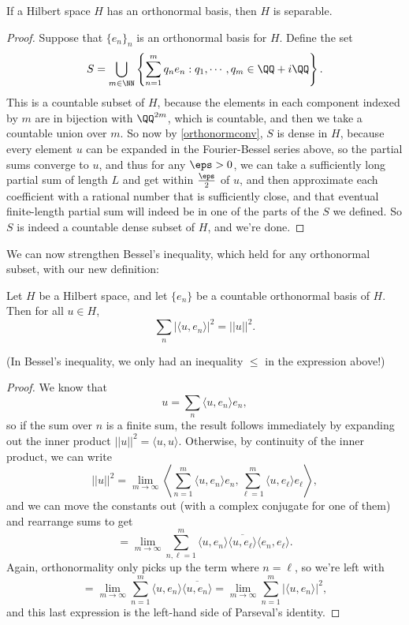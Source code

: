 \begin{corollary}
If a Hilbert space $H$ has an orthonormal basis, then $H$ is separable.
\end{corollary}
\begin{proof}
Suppose that $\{e_n\}_n$ is an orthonormal basis for $H$. Define the set 
\[
    S = \bigcup_{m \in \NN} \left\{\sum_{n=1}^m q_n e_n: q_1, \cdots, q_m \in \QQ + i \QQ\right\}.
\]  
This is a countable subset of $H$, because the elements in each component indexed by $m$ are in bijection with $\QQ^{2m}$, which is countable, and then we take a countable union over $m$. So now by \cref{orthonormconv}, $S$ is dense in $H$, because every element $u$ can be expanded in the Fourier-Bessel series above, so the partial sums converge to $u$, and thus for any $\eps > 0$, we can take a sufficiently long partial sum of length $L$ and get within $\frac{\eps}{2}$ of $u$, and then approximate each coefficient with a rational number that is sufficiently close, and that eventual finite-length partial sum will indeed be in one of the parts of the $S$ we defined. So $S$ is indeed a countable dense subset of $H$, and we're done.
\end{proof}

We can now strengthen Bessel's inequality, which held for any orthonormal subset, with our new definition:

\begin{theorem}
Let $H$ be a Hilbert space, and let $\{e_n\}$ be a countable orthonormal basis of $H$. Then for all $u \in H$,
\[
    \sum_{n} |\langle u, e_n \rangle|^2 = ||u||^2.
\]
\end{theorem}

(In Bessel's inequality, we only had an inequality $\le$ in the expression above!)

\begin{proof}
We know that 
\[
    u = \sum_n \langle u, e_n \rangle e_n,
\]
so if the sum over $n$ is a finite sum, the result follows immediately by expanding out the inner product $||u||^2 = \langle u, u \rangle$. Otherwise, by continuity of the inner product, we can write 
\[
    ||u||^2 = \lim_{m \to \infty} \left \langle \sum_{n=1}^m \langle u, e_n \rangle e_n , \sum_{\ell = 1}^m \langle u, e_\ell \rangle e_\ell \right\rangle,
\]
and we can move the constants out (with a complex conjugate for one of them) and rearrange sums to get 
\[
    = \lim_{m \to \infty} \sum_{n, \ell = 1}^m \langle u, e_n \rangle \overline{\langle u, e_\ell \rangle} \langle e_n, e_\ell \rangle.
\]
Again, orthonormality only picks up the term where $n = \ell$, so we're left with 
\[
    = \lim_{m \to \infty} \sum_{n=1}^m \langle u, e_n \rangle \overline{\langle u, e_n \rangle} = \lim_{ m \to \infty} \sum_{n=1}^m |\langle u, e_n \rangle|^2,
\]
and this last expression is the left-hand side of Parseval's identity.
\end{proof}

